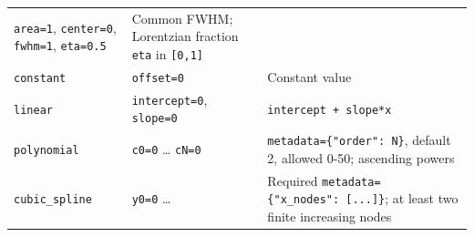 \documentclass[
  10pt,
  a4paper,
  oneside]{scrreprt}
\begin{document}
\begin{longtable}[]{@{}lll@{}}
\begin{minipage}[t]{0.30\columnwidth}
\texttt{area=1}, \texttt{center=0}, \texttt{fwhm=1},
\texttt{eta=0.5}\strut
\end{minipage} & \begin{minipage}[t]{0.30\columnwidth}\raggedright
Common FWHM; Lorentzian fraction \texttt{eta} in
\texttt{{[}0,1{]}}\strut
\end{minipage}\tabularnewline
\begin{minipage}[t]{0.30\columnwidth}\raggedright
\texttt{constant}\strut
\end{minipage} & \begin{minipage}[t]{0.30\columnwidth}\raggedright
\texttt{offset=0}\strut
\end{minipage} & \begin{minipage}[t]{0.30\columnwidth}\raggedright
Constant value\strut
\end{minipage}\tabularnewline
\begin{minipage}[t]{0.30\columnwidth}\raggedright
\texttt{linear}\strut
\end{minipage} & \begin{minipage}[t]{0.30\columnwidth}\raggedright
\texttt{intercept=0}, \texttt{slope=0}\strut
\end{minipage} & \begin{minipage}[t]{0.30\columnwidth}\raggedright
\texttt{intercept\ +\ slope*x}\strut
\end{minipage}\tabularnewline
\begin{minipage}[t]{0.30\columnwidth}\raggedright
\texttt{polynomial}\strut
\end{minipage} & \begin{minipage}[t]{0.30\columnwidth}\raggedright
\texttt{c0=0} \ldots{} \texttt{cN=0}\strut
\end{minipage} & \begin{minipage}[t]{0.30\columnwidth}\raggedright
\texttt{metadata=\{"order":\ N\}}, default 2, allowed 0-50; ascending
powers\strut
\end{minipage}\tabularnewline
\begin{minipage}[t]{0.30\columnwidth}\raggedright
\texttt{cubic\_spline}\strut
\end{minipage} & \begin{minipage}[t]{0.30\columnwidth}\raggedright
\texttt{y0=0} \ldots{}\strut
\end{minipage} & \begin{minipage}[t]{0.30\columnwidth}\raggedright
Required \texttt{metadata=\{"x\_nodes":\ {[}...{]}\}}; at least two
finite increasing nodes\strut
\end{minipage}\tabularnewline
\bottomrule
\end{longtable}
\end{document}
